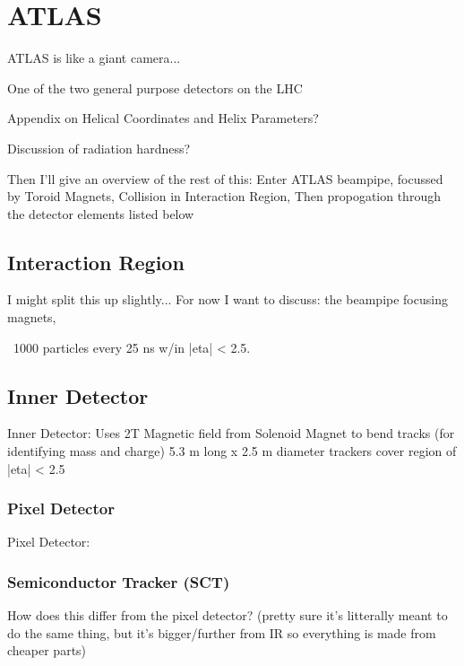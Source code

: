 
\chapter{ATLAS}
    ATLAS is like a giant camera...

    One of the two general purpose detectors on the LHC

    Appendix on Helical Coordinates and Helix Parameters?

    Discussion of radiation hardness?

    Then I'll give an overview of the rest of this:
        Enter ATLAS beampipe,
        focussed by Toroid Magnets,
        Collision in Interaction Region,
        Then propogation through the detector elements listed below



\section{Interaction Region}
    I might split this up slightly... For now I want to discuss:
        the beampipe focusing magnets,

    ~1000 particles every 25 ns w/in |eta| < 2.5.



\section{Inner Detector}
    Inner Detector:
        Uses 2T Magnetic field from Solenoid Magnet to bend tracks (for identifying mass and charge)
        5.3 m long x 2.5 m diameter
        trackers cover region of |eta| < 2.5


    \subsection{Pixel Detector}
        Pixel Detector:


    \subsection{Semiconductor Tracker (SCT)}
        How does this differ from the pixel detector? (pretty sure it's litterally meant to do the same thing, but it's bigger/further from IR so everything is made from cheaper parts)



